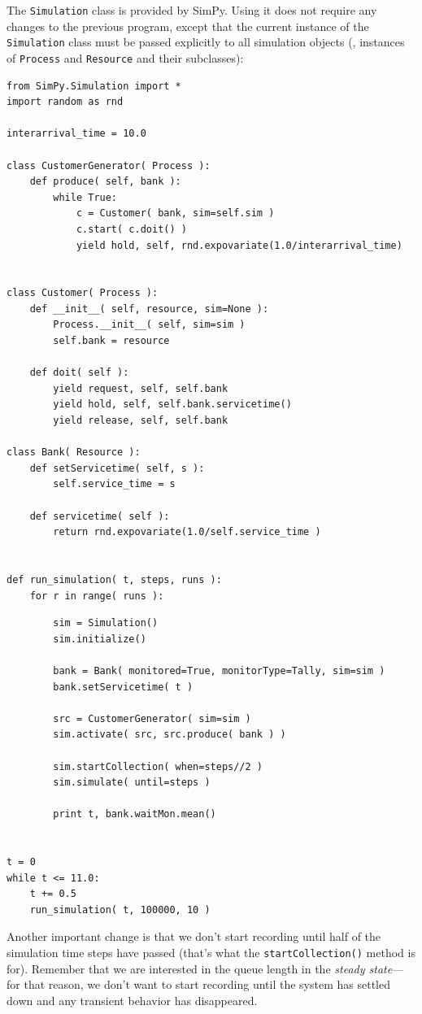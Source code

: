The \texttt{Simulation} class is provided by SimPy. Using it does not
require any changes to the previous program, except that the current
instance of the \texttt{Simulation} class must be passed explicitly to
all simulation objects (\ie, instances of \texttt{Process} and
\texttt{Resource} and their subclasses):

\begin{verbatim}
from SimPy.Simulation import *
import random as rnd

interarrival_time = 10.0

class CustomerGenerator( Process ):
    def produce( self, bank ):
        while True:
            c = Customer( bank, sim=self.sim )
            c.start( c.doit() )
            yield hold, self, rnd.expovariate(1.0/interarrival_time)


class Customer( Process ):
    def __init__( self, resource, sim=None ):
        Process.__init__( self, sim=sim )
        self.bank = resource
    
    def doit( self ):
        yield request, self, self.bank
        yield hold, self, self.bank.servicetime()
        yield release, self, self.bank

class Bank( Resource ):
    def setServicetime( self, s ):
        self.service_time = s
        
    def servicetime( self ):
        return rnd.expovariate(1.0/self.service_time )


def run_simulation( t, steps, runs ):
    for r in range( runs ):
\end{verbatim}
\begin{verbatim}
        sim = Simulation()
        sim.initialize()
        
        bank = Bank( monitored=True, monitorType=Tally, sim=sim )
        bank.setServicetime( t )

        src = CustomerGenerator( sim=sim )
        sim.activate( src, src.produce( bank ) )

        sim.startCollection( when=steps//2 )
        sim.simulate( until=steps )
        
        print t, bank.waitMon.mean()
    

t = 0
while t <= 11.0:
    t += 0.5
    run_simulation( t, 100000, 10 )
\end{verbatim}

Another important change is that we don't start recording until half
of the simulation time steps have passed (that's what the
\texttt{startCollection()} method is for). Remember that we are
interested in the queue length in the \emph{steady state}---for that
reason, we don't want to start recording until the system has settled
down and any transient behavior has disappeared.

